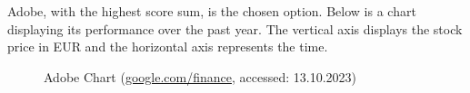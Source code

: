 Adobe, with the highest score sum, is the chosen option. Below is a chart displaying its performance over the past year. The vertical axis displays the stock price in \ac{EUR} and the horizontal axis represents the time.
\begin{figure}[H]
	\centering
	\caption[Adobe Chart]{Adobe Chart (\url{google.com/finance}, accessed: 13.10.2023)}
	\label{fig: Adobe Chart Last Year}
\end{figure}
